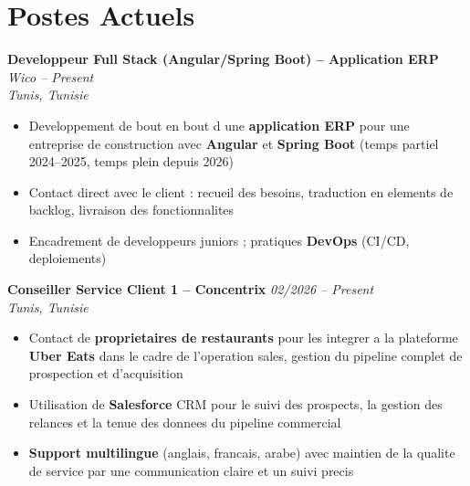 \documentclass[10pt,a4paper]{article}
\begin{document}
\section*{Postes Actuels}
{\small
\textbf{Developpeur Full Stack (Angular/Spring Boot) -- Application ERP} \hfill \textit{Wico \;\textbar{} -- Present}\\[1pt]
\textit{Tunis, Tunisie}
\begin{itemize}
  \item Developpement de bout en bout d une \textbf{application ERP} pour une entreprise de construction avec \textbf{Angular} et \textbf{Spring Boot} (temps partiel 2024--2025, temps plein depuis 2026)
  \item Contact direct avec le client : recueil des besoins, traduction en elements de backlog, livraison des fonctionnalites
  \item Encadrement de developpeurs juniors ; pratiques \textbf{DevOps} (CI/CD, deploiements)
\end{itemize}

\vspace{4pt}
\textbf{Conseiller Service Client 1 -- Concentrix} \hfill \textit{02/2026 -- Present}\\[1pt]
\textit{Tunis, Tunisie}
\begin{itemize}
  \item Contact de \textbf{proprietaires de restaurants} pour les integrer a la plateforme \textbf{Uber Eats} dans le cadre de l'operation sales, gestion du pipeline complet de prospection et d'acquisition
  \item Utilisation de \textbf{Salesforce} CRM pour le suivi des prospects, la gestion des relances et la tenue des donnees du pipeline commercial
  \item \textbf{Support multilingue} (anglais, francais, arabe) avec maintien de la qualite de service par une communication claire et un suivi precis
\end{itemize}
}

\end{document}
